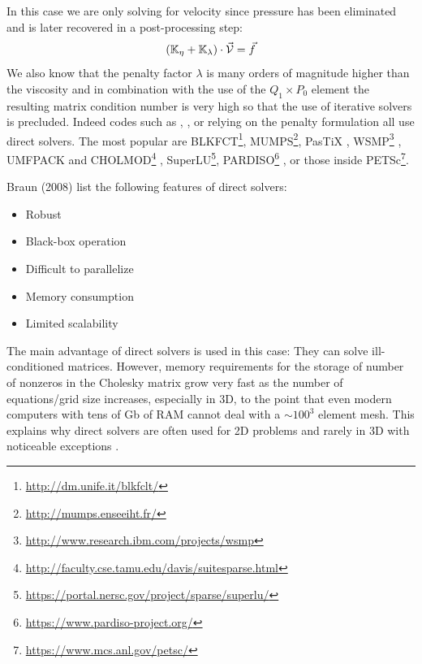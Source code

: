 In this case we are only solving for 
velocity since pressure has been eliminated and is later recovered in a post-processing step:
\[
({\mathbb{K}}_\eta+{\mathbb{K}}_\lambda) \cdot \vec {\cal V} = \vec f
\]
 We also know that 
the penalty factor $\lambda$ is many orders of magnitude higher than the viscosity and 
in combination with the use of the $Q_1 \times P_0$ element the resulting matrix 
condition number is very high so that the use of iterative solvers is precluded. 
Indeed codes such as \sopale \cite{full95}, \douar \cite{brtf08}, \fantom \cite{thie11} 
or \sulec \cite{qube11} relying on the penalty formulation all use direct solvers.
The most popular are BLKFCT\footnote{\url{http://dm.unife.it/blkfclt/}}, 
MUMPS\footnote{\url{http://mumps.enseeiht.fr/}}\cite{amdu89,amdl00,amdk01,amgl06,ambl19}, 
PasTiX \cite{herr02},
WSMP\footnote{\url{http://www.research.ibm.com/projects/wsmp}} \cite{GUPTA94ieee,GUPTA09sc-long},
UMFPACK and CHOLMOD\footnote{\url{http://faculty.cse.tamu.edu/davis/suitesparse.html}}
, SuperLU\footnote{\url{https://portal.nersc.gov/project/sparse/superlu/}}, 
PARDISO\footnote{\url{https://www.pardiso-project.org/}}
\cite{pardiso-6.0a,pardiso-6.0b,pardiso-6.0c}, or those inside 
PETSc\footnote{\url{https://www.mcs.anl.gov/petsc/}}.

Braun \etal (2008) \cite{brtf08} list the following features of direct solvers:
\begin{itemize}
\item Robust
\item Black-box operation
\item Difficult to parallelize
\item Memory consumption
\item Limited scalability
\end{itemize}

The main advantage of direct solvers is used in this case: They can solve ill-conditioned 
matrices. However, memory requirements for the storage of number of nonzeros in the 
Cholesky matrix grow very fast as the number of equations/grid size increases, especially in 3D,
to the point that even modern computers with tens of Gb of RAM cannot deal with a $\sim 100^3$ element mesh.
This explains why direct solvers are often used for 2D problems and rarely in 3D with noticeable 
exceptions \cite{thfb08,yahb09,brya10,lobh10,alht11,alht12,alhf13,whbb14,neew18}. 

